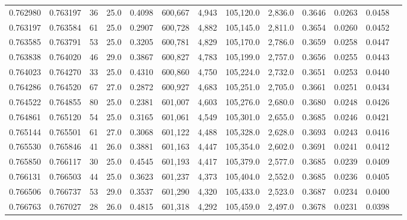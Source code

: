 \begin{tabular}{rrrrrrrrrrrrr}
0.762980 & 0.763197 &    36 & 25.0 &                                     0.4098 & 600,667 &   4,943 & 105,120.0 &   2,836.0 & 0.3646 & 0.0263 & 0.0458 \\
0.763197 & 0.763584 &    61 & 25.0 &                                     0.2907 & 600,728 &   4,882 & 105,145.0 &   2,811.0 & 0.3654 & 0.0260 & 0.0452 \\
0.763585 & 0.763791 &    53 & 25.0 &                                     0.3205 & 600,781 &   4,829 & 105,170.0 &   2,786.0 & 0.3659 & 0.0258 & 0.0447 \\
0.763838 & 0.764020 &    46 & 29.0 &                                     0.3867 & 600,827 &   4,783 & 105,199.0 &   2,757.0 & 0.3656 & 0.0255 & 0.0443 \\
0.764023 & 0.764270 &    33 & 25.0 &                                     0.4310 & 600,860 &   4,750 & 105,224.0 &   2,732.0 & 0.3651 & 0.0253 & 0.0440 \\
0.764286 & 0.764520 &    67 & 27.0 &                                     0.2872 & 600,927 &   4,683 & 105,251.0 &   2,705.0 & 0.3661 & 0.0251 & 0.0434 \\
0.764522 & 0.764855 &    80 & 25.0 &                                     0.2381 & 601,007 &   4,603 & 105,276.0 &   2,680.0 & 0.3680 & 0.0248 & 0.0426 \\
0.764861 & 0.765120 &    54 & 25.0 &                                     0.3165 & 601,061 &   4,549 & 105,301.0 &   2,655.0 & 0.3685 & 0.0246 & 0.0421 \\
0.765144 & 0.765501 &    61 & 27.0 &                                     0.3068 & 601,122 &   4,488 & 105,328.0 &   2,628.0 & 0.3693 & 0.0243 & 0.0416 \\
0.765530 & 0.765846 &    41 & 26.0 &                                     0.3881 & 601,163 &   4,447 & 105,354.0 &   2,602.0 & 0.3691 & 0.0241 & 0.0412 \\
0.765850 & 0.766117 &    30 & 25.0 &                                     0.4545 & 601,193 &   4,417 & 105,379.0 &   2,577.0 & 0.3685 & 0.0239 & 0.0409 \\
0.766131 & 0.766503 &    44 & 25.0 &                                     0.3623 & 601,237 &   4,373 & 105,404.0 &   2,552.0 & 0.3685 & 0.0236 & 0.0405 \\
0.766506 & 0.766737 &    53 & 29.0 &                                     0.3537 & 601,290 &   4,320 & 105,433.0 &   2,523.0 & 0.3687 & 0.0234 & 0.0400 \\
0.766763 & 0.767027 &    28 & 26.0 &                                     0.4815 & 601,318 &   4,292 & 105,459.0 &   2,497.0 & 0.3678 & 0.0231 & 0.0398 \\

\end{tabular}
